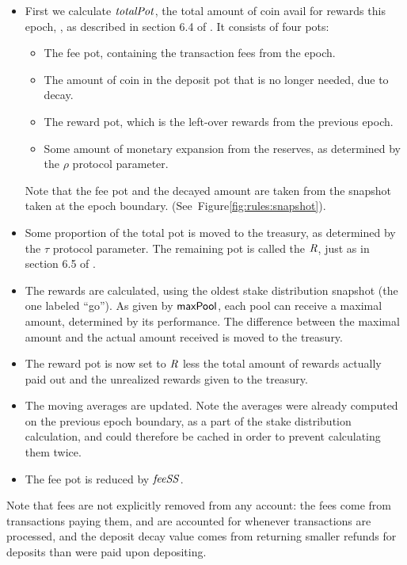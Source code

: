 \begin{itemize}
  \item First we calculate $\mathit{totalPot}$, the total amount of coin avail for rewards this epoch,
    , as described in section 6.4 of \cite{delegation_design}. It consists of four pots:
    \begin{itemize}
      \item The fee pot, containing the transaction fees from the epoch.
      \item The amount of coin in the deposit pot that is no longer needed, due to decay.
      \item The reward pot, which is the left-over rewards from the previous epoch.
      \item Some amount of monetary expansion from the reserves, as determined by the
        $\rho$ protocol parameter.
    \end{itemize}
    Note that the fee pot and the decayed amount are taken from the snapshot taken at the
    epoch boundary.  (See~Figure\ref{fig:rules:snapshot}).
  \item Some proportion of the total pot is moved to the treasury,
    as determined by the $\tau$ protocol parameter. The remaining pot is called the
    $\mathit{R}$, just as in section 6.5 of \cite{delegation_design}.
  \item The rewards are calculated, using the oldest stake distribution snapshot (the one
    labeled ``go'').
    As given by $\mathsf{maxPool}$, each pool can receive a maximal amount, determined by its
    performance.  The difference between the maximal amount and the actual amount received is
    moved to the treasury.
  \item The reward pot is now set to $\mathit{R}$ less the total amount of rewards
    actually paid out and the unrealized rewards given to the treasury.
  \item The moving averages are updated.  Note the averages were already computed on the previous
    epoch boundary, as a part of the stake distribution calculation, and could therefore
    be cached in order to prevent calculating them twice.
  \item The fee pot is reduced by $\mathit{feeSS}$.
\end{itemize}

Note that fees are not explicitly removed from any account:
the fees come from transactions paying them, and are accounted for whenever
transactions are processed, and the deposit decay value comes from returning
smaller refunds for deposits than were paid upon depositing.

